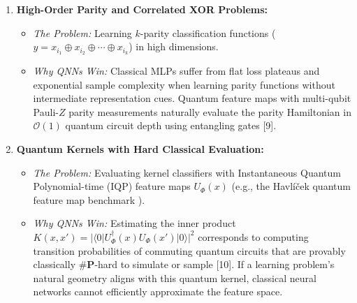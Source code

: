 \begin{enumerate}[leftmargin=*]
  \item \textbf{High-Order Parity and Correlated XOR Problems:}
  \begin{itemize}[leftmargin=*]
    \item \emph{The Problem:} Learning $k$-parity classification functions ($y = x_{i_1} \oplus x_{i_2} \oplus \cdots \oplus x_{i_k}$) in high dimensions.
    \item \emph{Why QNNs Win:} Classical MLPs suffer from flat loss plateaus and exponential sample complexity when learning parity functions without intermediate representation cues. Quantum feature maps with multi-qubit Pauli-$Z$ parity measurements naturally evaluate the parity Hamiltonian in $\mathcal{O}(1)$ quantum circuit depth using entangling gates [9].
  \end{itemize}
  \item \textbf{Quantum Kernels with Hard Classical Evaluation:}
  \begin{itemize}[leftmargin=*]
    \item \emph{The Problem:} Evaluating kernel classifiers with Instantaneous Quantum Polynomial-time (IQP) feature maps $U_\Phi(x)$ (e.g., the Havl\'i\v{c}ek quantum feature map benchmark \cite{havlicek2019supervised}).
    \item \emph{Why QNNs Win:} Estimating the inner product $K(x, x') = |\langle 0 | U_\Phi^\dagger(x) U_\Phi(x') | 0 \rangle|^2$ corresponds to computing transition probabilities of commuting quantum circuits that are provably classically $\#\mathbf{P}$-hard to simulate or sample [10]. If a learning problem's natural geometry aligns with this quantum kernel, classical neural networks cannot efficiently approximate the feature space.
  \end{itemize}
\end{enumerate}

